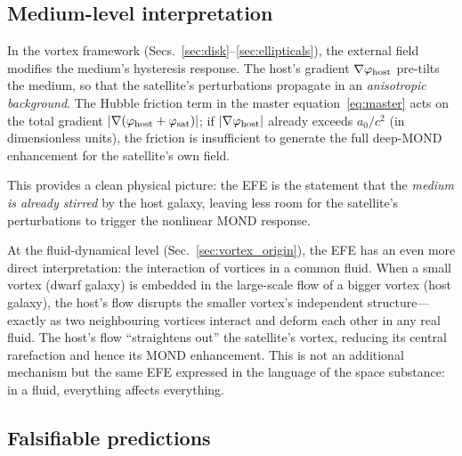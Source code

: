\documentclass[11pt]{article}
\begin{document}
\subsection{Medium-level interpretation}

In the vortex framework (Secs.~\ref{sec:disk}--\ref{sec:ellipticals}),
the external field modifies the medium's hysteresis response.  The
host's gradient $\nabla\varphi_{\rm host}$ pre-tilts the medium,
so that the satellite's perturbations propagate in an
\emph{anisotropic background}.  The Hubble friction term in the
master equation~\eqref{eq:master} acts on the total gradient
$|\nabla(\varphi_{\rm host}+\varphi_{\rm sat})|$; if
$|\nabla\varphi_{\rm host}|$ already exceeds $a_0/c^2$ (in
dimensionless units), the friction is insufficient to generate the
full deep-MOND enhancement for the satellite's own field.

This provides a clean physical picture: the EFE is the statement that
the \emph{medium is already stirred} by the host galaxy, leaving
less room for the satellite's perturbations to trigger the nonlinear
MOND response.

At the fluid-dynamical level (Sec.~\ref{sec:vortex_origin}), the
EFE has an even more direct interpretation: the interaction of
vortices in a common fluid.  When a small vortex (dwarf galaxy)
is embedded in the large-scale flow of a bigger vortex (host
galaxy), the host's flow disrupts the smaller vortex's
independent structure---exactly as two neighbouring vortices
interact and deform each other in any real fluid.
The host's flow ``straightens out'' the satellite's vortex,
reducing its central rarefaction and hence its MOND
enhancement.  This is not an additional mechanism but the
same EFE expressed in the language of the space substance:
in a fluid, everything affects everything.

\subsection{Falsifiable predictions}
\end{document}
